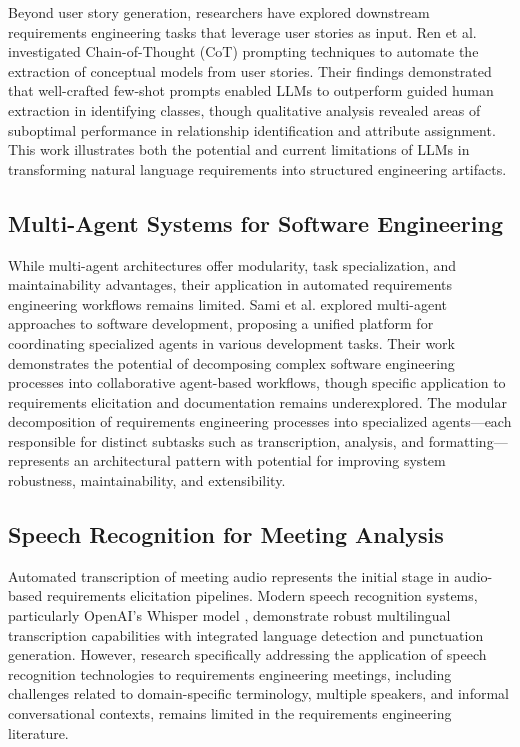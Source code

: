 \documentclass[12pt]{article}
\begin{document}
Beyond user story generation, researchers have explored downstream requirements engineering tasks that leverage user stories as input. Ren et al. \cite{ren2024combining} investigated Chain-of-Thought (CoT) prompting techniques to automate the extraction of conceptual models from user stories. Their findings demonstrated that well-crafted few-shot prompts enabled LLMs to outperform guided human extraction in identifying classes, though qualitative analysis revealed areas of suboptimal performance in relationship identification and attribute assignment. This work illustrates both the potential and current limitations of LLMs in transforming natural language requirements into structured engineering artifacts.

\subsection{Multi-Agent Systems for Software Engineering}

While multi-agent architectures offer modularity, task specialization, and maintainability advantages, their application in automated requirements engineering workflows remains limited. Sami et al. \cite{sami2024experimentingmultiagent} explored multi-agent approaches to software development, proposing a unified platform for coordinating specialized agents in various development tasks. Their work demonstrates the potential of decomposing complex software engineering processes into collaborative agent-based workflows, though specific application to requirements elicitation and documentation remains underexplored. The modular decomposition of requirements engineering processes into specialized agents—each responsible for distinct subtasks such as transcription, analysis, and formatting—represents an architectural pattern with potential for improving system robustness, maintainability, and extensibility.

\subsection{Speech Recognition for Meeting Analysis}

Automated transcription of meeting audio represents the initial stage in audio-based requirements elicitation pipelines. Modern speech recognition systems, particularly OpenAI's Whisper model \cite{whisper2022}, demonstrate robust multilingual transcription capabilities with integrated language detection and punctuation generation. However, research specifically addressing the application of speech recognition technologies to requirements engineering meetings, including challenges related to domain-specific terminology, multiple speakers, and informal conversational contexts, remains limited in the requirements engineering literature.
\end{document}
